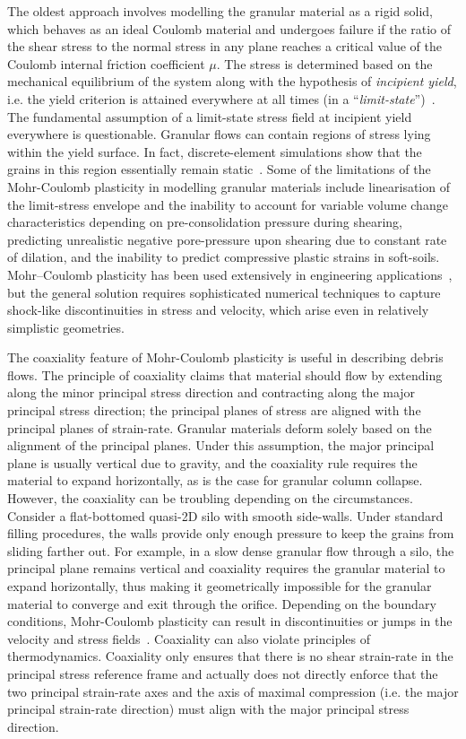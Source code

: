 The oldest approach involves modelling the granular material as a rigid solid, 
which behaves as an ideal Coulomb material and undergoes failure if the ratio 
of the shear stress to the normal stress in any plane reaches a critical value 
of the Coulomb internal friction coefficient $\mu$. The stress is determined 
based on the mechanical equilibrium of the system along with the hypothesis of 
\textit{incipient yield}, i.e. the yield criterion is attained everywhere at 
all times (in a ``\textit{limit-state}'')~\citep{Rycroft2009b}. The fundamental 
assumption of a limit-state stress field at incipient yield everywhere is 
questionable. Granular flows can contain regions of stress lying within the 
yield surface. In fact, discrete-element simulations show that the grains in 
this region essentially remain static~\citep{Staron2005}. Some of the 
limitations of the Mohr-Coulomb plasticity in modelling granular materials 
include linearisation of the limit-stress envelope and the inability to account 
for variable volume change characteristics depending on pre-consolidation 
pressure during shearing, predicting unrealistic negative pore-pressure upon 
shearing due to constant rate of dilation, and the inability to predict 
compressive plastic strains in soft-soils. Mohr–Coulomb plasticity has been 
used extensively in engineering applications~\citep{Nedderman1992}, but the 
general solution requires sophisticated numerical techniques to capture 
shock-like discontinuities in stress and velocity, which arise even in 
relatively simplistic geometries. 

The coaxiality feature of Mohr-Coulomb plasticity 
is useful in describing debris flows. The principle of coaxiality
claims that material should flow by extending along the
minor principal stress direction and contracting along the major principal 
stress direction; the principal planes of stress are aligned with the principal 
planes of strain-rate. Granular materials deform solely based 
on the alignment of the principal planes. Under this assumption, the major 
principal plane is usually vertical due to gravity, and the coaxiality rule 
requires the material to expand horizontally, as is the case for granular 
column collapse. However, the coaxiality can be troubling depending on the 
circumstances. Consider a flat-bottomed quasi-2D silo with smooth 
side-walls. Under standard filling procedures, the walls provide only enough 
pressure to keep the grains from sliding farther out.  For example, in a slow 
dense granular flow through a silo, the principal plane remains vertical and 
coaxiality requires the granular material to expand horizontally, thus 
making it geometrically impossible for the granular material to converge and 
exit through the orifice. Depending on the boundary conditions, Mohr-Coulomb 
plasticity can result in discontinuities or jumps in the velocity and stress 
fields~\citep{Rycroft2006}. Coaxiality can also violate principles of 
thermodynamics. Coaxiality only ensures that there is no shear strain-rate in 
the principal stress reference frame and actually does not directly enforce 
that the two principal strain-rate axes and the axis of maximal compression 
(i.e. the major principal strain-rate direction) must align with the major 
principal stress direction.

